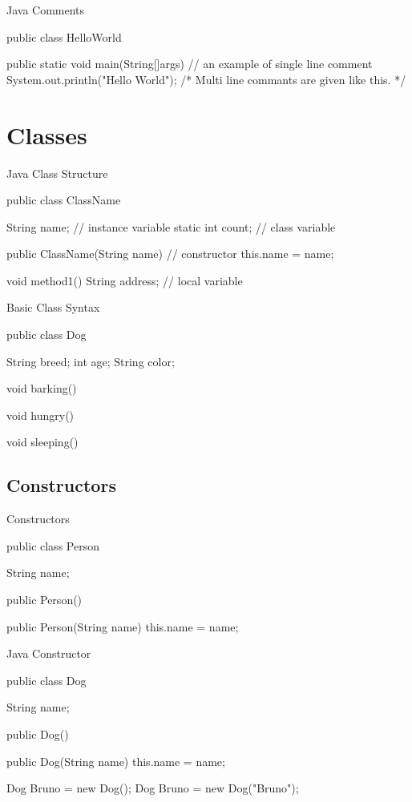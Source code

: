 \documentclass[11pt]{beamer}
\begin{document}
\begin{frame}[containsverbatim]{Java Comments}
\begin{java}
public class HelloWorld{

public static void main(String[]args){
  // an example of single line comment
  System.out.println("Hello World");
  /* Multi line commants 
   are given like this. */
  }
}
\end{java}
\end{frame}

\section{Classes}
\begin{frame}[containsverbatim]{Java Class Structure}
\begin{java}
public class ClassName{
  String name;      // instance variable
  static int count; // class variable

  public ClassName(String name){ // constructor
    this.name = name;  
  }

  void method1(){
    String address; // local variable
  }  
}
\end{java}

\end{frame}


\begin{frame}[containsverbatim]{Basic Class Syntax}
\begin{java}
public class Dog{
	String breed;
	int age;
	String color;

	void barking(){
	}

	void hungry(){
	}

	void sleeping(){
	}
}
\end{java}
\end{frame}

\subsection{Constructors}
\begin{frame}[containsverbatim]{Constructors}
\begin{java}
public class Person{

	String name;
	
	public Person(){
	}
	
	public Person(String name){
		this.name = name;
	}
}
\end{java}
\end{frame}

\begin{frame}[containsverbatim]{Java Constructor}
\begin{java}
public class Dog{
  String name;  
  
  public Dog(){
  }

  public Dog(String name){
  this.name = name;
  }
}
\end{java}


\begin{java}
Dog Bruno = new Dog();
Dog Bruno = new Dog("Bruno");
\end{java}

\end{frame}
\end{document}
